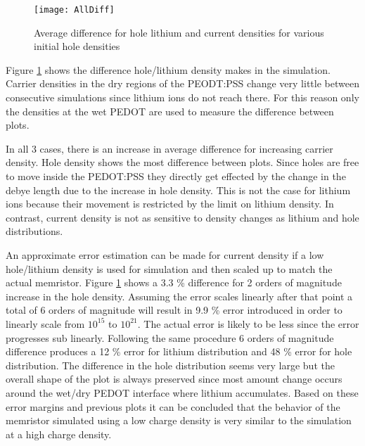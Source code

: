 \begin{doublespace}
\begin{figure}[!htp]
\centering
\texttt{[image: AllDiff]}
\caption{Average difference for hole lithium and current densities for various initial hole densities} 
\label{AllDiff}
\end{figure}

Figure \ref{AllDiff} shows the difference hole/lithium density makes in the simulation. Carrier densities in the dry regions of the PEODT:PSS change very little between consecutive simulations since lithium ions do not reach there. For this reason only the densities at the wet PEDOT are used to measure the difference between plots. 

In all 3 cases, there is an increase in average difference for increasing carrier density. Hole density shows the most difference between plots. Since holes are free to move inside the PEDOT:PSS they directly get effected by the change in the debye length due to the increase in hole density. This is not the case for lithium ions because their movement is restricted by the limit on lithium density. In contrast, current density is not as sensitive to density changes as lithium and hole distributions.

 An approximate error estimation can be made for current density if a low hole/lithium density is used for simulation and then scaled up to match the actual memristor. Figure \ref{AllDiff} shows a 3.3 \% difference for 2 orders of magnitude increase in the hole density. Assuming the error scales linearly after that point a total of 6 orders of magnitude will result in 9.9 \% error introduced in order to linearly scale from $10^{15}$ to $10^{21}$. The actual error is likely to be less since the error progresses sub linearly. Following the same procedure 6 orders of magnitude difference produces a 12 \% error for lithium distribution and 48 \% error for hole distribution. The difference in the hole distribution seems very large but the overall shape of the plot is always preserved since most amount change occurs around the wet/dry PEDOT interface where lithium accumulates. Based on these error margins and previous plots it can be concluded that the behavior of the memristor simulated using a low charge density is very similar to the simulation at a high charge density.    


\end{doublespace}
